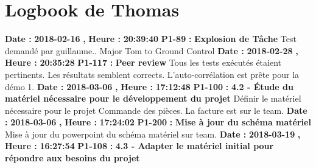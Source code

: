 \documentclass{article}%
\begin{document}
\section{Logbook de Thomas}%
\textbf{Date : }%
\textbf{2018{-}02{-}16}%
\textbf{,}%
\textbf{ Heure : }%
\textbf{20:39:40}%
\newline%
%
\textbf{P1{-}89 }%
\textbf{ : }%
\textbf{ Explosion de Tâche}%
\newline%
\newline%
%
Test demandé par guillaume.. Major Tom to Ground Control\newline%
\newline%
%
\textbf{Date : }%
\textbf{2018{-}02{-}28}%
\textbf{,}%
\textbf{ Heure : }%
\textbf{20:35:28}%
\newline%
%
\textbf{P1{-}117 }%
\textbf{ : }%
\textbf{ Peer review}%
\newline%
\newline%
%
Tous les tests exécutés étaient pertinents. Les résultats semblent corrects. L'auto{-}corrélation est prête pour la démo 1.\newline%
\newline%
%
\textbf{Date : }%
\textbf{2018{-}03{-}06}%
\textbf{,}%
\textbf{ Heure : }%
\textbf{17:12:48}%
\newline%
%
\textbf{P1{-}100 }%
\textbf{ : }%
\textbf{ 4.2 {-} Étude du matériel nécessaire pour le développement du projet}%
\newline%
\newline%
%
Définir le matériel nécessaire pour le projet\newline%
Commande des pièces.\newline%
La facture est sur le team.\newline%
\newline%
%
\textbf{Date : }%
\textbf{2018{-}03{-}06}%
\textbf{,}%
\textbf{ Heure : }%
\textbf{17:24:02}%
\newline%
%
\textbf{P1{-}200 }%
\textbf{ : }%
\textbf{ Mise à jour du schéma matériel}%
\newline%
\newline%
%
Mise à jour du powerpoint du schéma matériel sur team.\newline%
\newline%
%
\textbf{Date : }%
\textbf{2018{-}03{-}19}%
\textbf{,}%
\textbf{ Heure : }%
\textbf{16:27:54}%
\newline%
%
\textbf{P1{-}108 }%
\textbf{ : }%
\textbf{ 4.3 {-} Adapter le matériel initial pour répondre aux besoins du projet}%
\newline%
\end{document}
